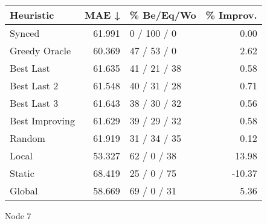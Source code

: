 \begin{tabular}{lrlr}
\toprule
\textbf{Heuristic} & \textbf{MAE ↓} & \textbf{\% Be/Eq/Wo} & \textbf{\% Improv.} \\
\midrule
            Synced &         61.991 &          0 / 100 / 0 &                0.00 \\
     Greedy Oracle &         60.369 &          47 / 53 / 0 &                2.62 \\
         Best Last &         61.635 &         41 / 21 / 38 &                0.58 \\
       Best Last 2 &         61.548 &         40 / 31 / 28 &                0.71 \\
       Best Last 3 &         61.643 &         38 / 30 / 32 &                0.56 \\
    Best Improving &         61.629 &         39 / 29 / 32 &                0.58 \\
            Random &         61.919 &         31 / 34 / 35 &                0.12 \\
             Local &         53.327 &          62 / 0 / 38 &               13.98 \\
            Static &         68.419 &          25 / 0 / 75 &              -10.37 \\
            Global &         58.669 &          69 / 0 / 31 &                5.36 \\
\bottomrule
\end{tabular}
\caption{Node 7}
\label{tab:non_lr05_le1_bs4_7}
